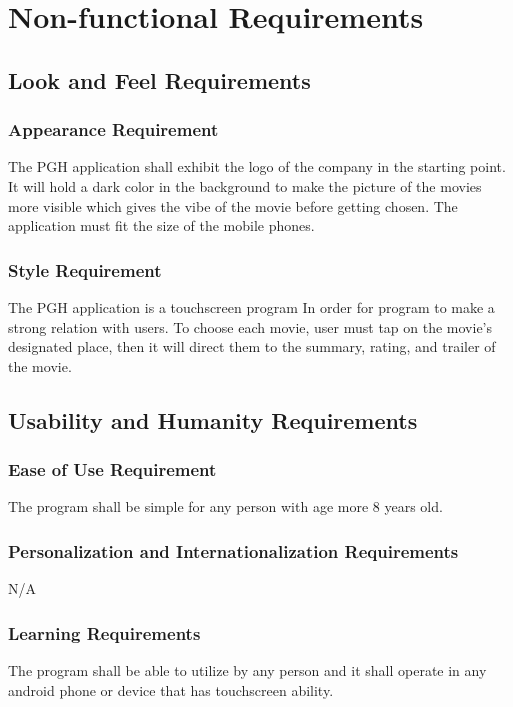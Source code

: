 \documentclass[12pt, titlepage]{article}
\begin{document}
\section{Non-functional Requirements}

\subsection{Look and Feel Requirements}
\subsubsection{Appearance Requirement}
The PGH application shall exhibit the logo of the company in the starting point. It will hold a dark color in the background to make the picture of the movies more visible which gives the vibe of the movie before getting chosen. The application must fit the size of the mobile phones. 

\subsubsection{Style Requirement}
The PGH application is a touchscreen program In order for program to make a strong relation with users. To choose each movie, user must tap on the movie’s designated place, then it will direct them to the summary, rating, and trailer of the movie.


\subsection{Usability and Humanity Requirements}
\subsubsection{Ease of Use Requirement}
The program shall be simple for any person with age more 8 years old. 

\subsubsection{Personalization and Internationalization Requirements}
N/A

\subsubsection{Learning Requirements}
The program shall be able to utilize by any person and it shall operate in any android phone or device that has touchscreen ability.
\end{document}
